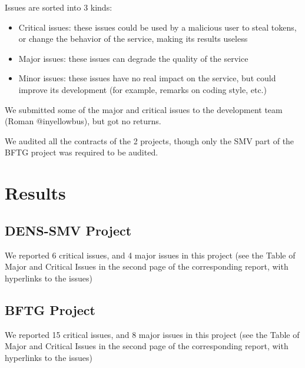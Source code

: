 \documentclass{article}
\begin{document}
Issues are sorted into 3 kinds:
\begin{itemize}
\item Critical issues: these issues could be used by a malicious user
  to steal tokens, or change the behavior of the service, making its
  results useless
\item Major issues: these issues can degrade the quality of the
  service
\item Minor issues: these issues have no real impact on the service,
  but could improve its development (for example, remarks on coding
  style, etc.)
\end{itemize}

We submitted some of the major and critical issues to the development
team (Roman @inyellowbus), but got no returns. 

We audited all the contracts of the 2 projects, though only the SMV
part of the BFTG project was required to be audited.

\section{Results}

\subsection{DENS-SMV Project}

We reported 6 critical issues, and 4 major issues in this project
(see the Table of Major and Critical Issues in the second page of the
corresponding report, with hyperlinks to the issues)

\subsection{BFTG Project}

We reported 15 critical issues, and 8 major issues in this project
(see the Table of Major and Critical Issues in the second page of the
corresponding report, with hyperlinks to the issues)
\end{document}
